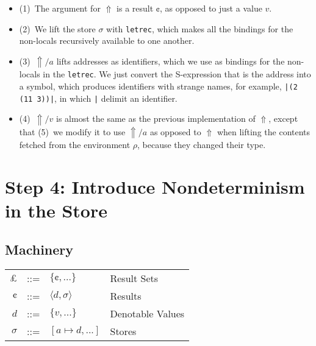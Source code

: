 \documentclass[12pt, oneside]{book}
\begin{document}
\begin{itemize}
  \item (1)~The argument for \(⇑\) is a result \(¢\), as opposed to just a value \(v\).
  \item (2)~We lift the store \(σ\) with \texttt{letrec}, which makes all the bindings for the non-locals recursively available to one another.
  \item (3)~\(⇑/a\) lifts addresses as identifiers, which we use as bindings for the non-locals in the \texttt{letrec}. We just convert the S-expression that is the address into a symbol, which produces identifiers with strange names, for example, \texttt{|(2 (11 3))|}, in which \texttt{|} delimit an identifier.
  \item (4)~\(⇑/v\) is almost the same as the previous implementation of \(⇑\), except that (5)~we modify it to use \(⇑/a\) as opposed to \(⇑\) when lifting the contents fetched from the environment \(ρ\), because they changed their type.
\end{itemize}

\section{Step 4: Introduce Nondeterminism in the Store}

\subsection{Machinery}

\begin{tabular}{rcll}
  \(£\) & ::= & \(\{¢, ...\}\)   & Result Sets      \\
  \(¢\) & ::= & \(⟨d, σ⟩\)       & Results          \\
  \(d\) & ::= & \(\{v, ...\}\)   & Denotable Values \\
  \(σ\) & ::= & \([a ↦ d, ...]\) & Stores           \\
\end{tabular}
\end{document}
